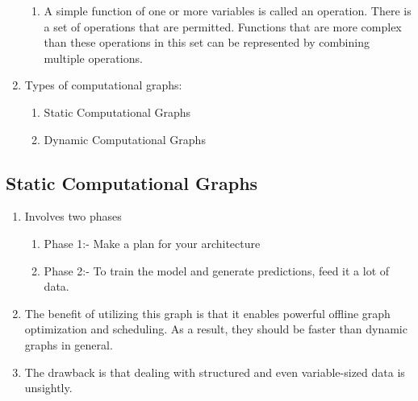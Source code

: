 \begin{enumerate}
\begin{enumerate}
        \item A simple function of one or more variables is called an operation. 
        There is a set of operations that are permitted. 
        Functions that are more complex than these operations in this set can be represented by combining multiple operations.
        \hfill \cite{geeksforgeeks/deep-learning/computational-graphs-in-deep-learning}
    \end{enumerate}

    \item Types of computational graphs:
    \begin{enumerate}
        \item Static Computational Graphs
        \hfill \cite{geeksforgeeks/deep-learning/computational-graphs-in-deep-learning}

        \item Dynamic Computational Graphs
        \hfill \cite{geeksforgeeks/deep-learning/computational-graphs-in-deep-learning}
    \end{enumerate}
\end{enumerate}


\subsection{Static Computational Graphs}
\begin{enumerate}
    \item Involves two phases
    \begin{enumerate}
        \item Phase 1:- Make a plan for your architecture
        \hfill \cite{geeksforgeeks/deep-learning/computational-graphs-in-deep-learning}

        \item Phase 2:- To train the model and generate predictions, feed it a lot of data.
        \hfill \cite{geeksforgeeks/deep-learning/computational-graphs-in-deep-learning}
    \end{enumerate}

    \item The benefit of utilizing this graph is that it enables powerful offline graph optimization and scheduling. As a result, they should be faster than dynamic graphs in general.
    \hfill \cite{geeksforgeeks/deep-learning/computational-graphs-in-deep-learning}

    \item The drawback is that dealing with structured and even variable-sized data is unsightly.
    \hfill \cite{geeksforgeeks/deep-learning/computational-graphs-in-deep-learning}
\end{enumerate}




